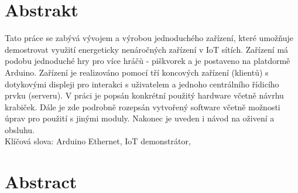 \section*{Abstrakt}
Tato práce se zabývá vývojem a výrobou jednoduchého zařízení, které umožňuje demostrovat využití energeticky nenáročných zařízení v IoT sítích. Zařízení má podobu jednoduché hry pro více hráčů - piškvorek a je postaveno na platdormě Arduino. Zařízení je realizováno pomocí tří koncových zařízení (klientů) s dotykovými displeji pro interakci s uživatelem a jednoho centrálního řídicího prvku (serveru). V práci je popsán konkrétní použitý hardware včetně návrhu krabiček. Dále je zde podrobně rozepsán vytvořený software včetně možnosti úprav pro použití s jinými moduly. Nakonec je uveden i návod na oživení a obsluhu.\\

\vspace{.5cm}
\noindent
Klíčová slova: Arduino Ethernet, IoT demonstrátor,



\section*{Abstract}
\notFinished
